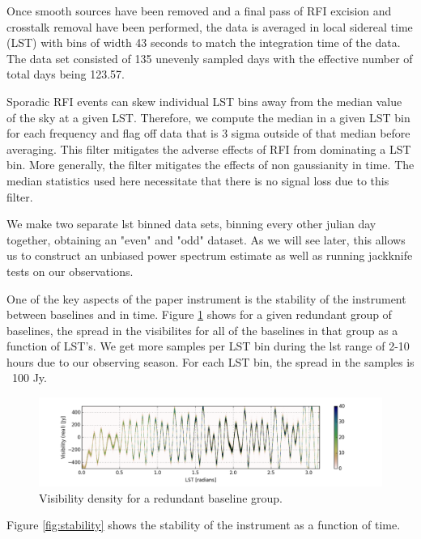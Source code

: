\documentclass[twocolumn,numberedappendix]{emulateapj} \shorttitle{PSA64}
\begin{document}
Once smooth sources have been removed and a final pass of RFI excision and
crosstalk removal have been performed, the data is averaged in local sidereal
time (LST) with bins of width 43 seconds to match the integration time of the
data. The data set consisted of 135 unevenly sampled days with the effective
number of total days being 123.57. 

Sporadic RFI events can skew individual LST bins away from the median value of
the sky at a given LST. Therefore, we compute the median in a given LST bin for
each frequency and flag off data that is 3 sigma outside of that median before
averaging. This filter mitigates the adverse effects of RFI from dominating a
LST bin. More generally, the filter mitigates the effects of non gaussianity in
time. The median statistics used here necessitate that there is no signal
loss due to this filter.

We make two separate lst binned data sets, binning every other julian day
together, obtaining an "even" and "odd" dataset.  As we will see later, this
allows us to construct an unbiased power spectrum estimate as well as running
jackknife tests on our observations. 

One of the key aspects of the paper instrument is the stability of the
instrument between baselines and in time. Figure \ref{fig:density} shows for a
given redundant group of baselines, the spread in the visibilites for all of the
baselines in that group as a function of LST's. We get more samples per LST bin
during the lst range of 2-10 hours due to our observing season. For each LST
bin, the spread in the samples is ~100 Jy.

\begin{figure}[!t]
\centering
\includegraphics[width=2.3\columnwidth]{plots/density.png}
\caption{Visibility density for a redundant baseline group.}
\label{fig:density}
\end{figure}

Figure \ref{fig:stability} shows the stability of the instrument as a function
of time. 
\end{document}
